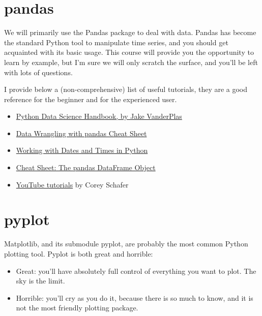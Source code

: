 \documentclass[
  letterpaper,
  DIV=11,
  numbers=noendperiod,
  oneside]{scrreprt}
\providecommand{\tightlist}{%
  \setlength{\itemsep}{0pt}\setlength{\parskip}{0pt}}\usepackage{longtable,booktabs,array}
\begin{document}
\hypertarget{pandas}{%
\section{pandas}\label{pandas}}

We will primarily use the Pandas package to deal with data. Pandas has
become the standard Python tool to manipulate time series, and you
should get acquainted with its basic usage. This course will provide you
the opportunity to learn by example, but I'm sure we will only scratch
the surface, and you'll be left with lots of questions.

I provide below a (non-comprehensive) list of useful tutorials, they are
a good reference for the beginner and for the experienced user.

\begin{itemize}
\tightlist
\item
  \href{https://jakevdp.github.io/PythonDataScienceHandbook/index.html}{Python
  Data Science Handbook, by Jake VanderPlas}
\item
  \href{https://pandas.pydata.org/Pandas_Cheat_Sheet.pdf}{Data Wrangling
  with pandas Cheat Sheet}
\item
  \href{https://images.datacamp.com/image/upload/v1666944896/Marketing/Blog/Working_with_Dates_and_Times_Cheat_Sheet.pdf}{Working
  with Dates and Times in Python}
\item
  \href{https://www.webpages.uidaho.edu/~stevel/cheatsheets/Pandas\%20DataFrame\%20Notes_12pages.pdf}{Cheat
  Sheet: The pandas DataFrame Object}
\item
  \href{https://www.youtube.com/watch?v=ZyhVh-qRZPA\&list=PL-osiE80TeTsWmV9i9c58mdDCSskIFdDS\&pp=iAQB}{YouTube
  tutorials} by Corey Schafer
\end{itemize}

\hypertarget{pyplot}{%
\section{pyplot}\label{pyplot}}

Matplotlib, and its submodule pyplot, are probably the most common
Python plotting tool. Pyplot is both great and horrible:

\begin{itemize}
\tightlist
\item
  Great: you'll have absolutely full control of everything you want to
  plot. The sky is the limit.
\item
  Horrible: you'll cry as you do it, because there is so much to know,
  and it is not the most friendly plotting package.
\end{itemize}
\end{document}
